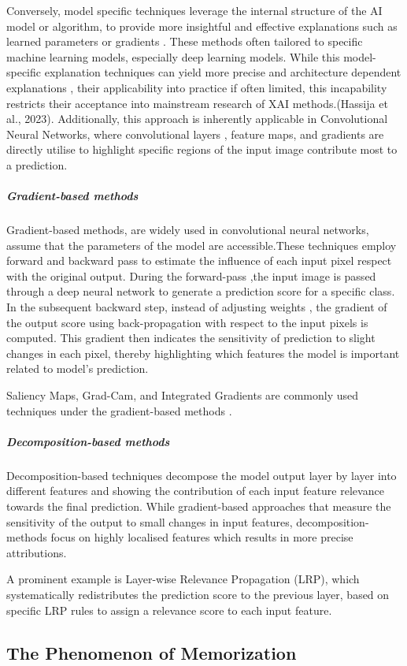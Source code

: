 Conversely, model specific techniques leverage the internal structure of the AI model or algorithm, to provide more insightful and effective explanations such as learned parameters or gradients . These methods often tailored to specific machine learning models, especially deep learning models. While this model-specific explanation techniques can yield more precise and architecture dependent explanations , their applicability into practice if often limited, this incapability restricts their acceptance into mainstream research of XAI methods.(Hassija et al., 2023). Additionally, this approach is inherently applicable in Convolutional Neural Networks, where convolutional layers , feature maps, and gradients are directly utilise to highlight specific regions of the input image contribute most to a prediction.

\subparagraph{Gradient-based methods}
Gradient-based methods, are widely used in convolutional neural networks, assume that the parameters of the model are accessible.These techniques employ forward and backward pass to estimate the  influence of each input pixel respect with the original output. During the  forward-pass ,the input image is passed through a deep neural network to generate a prediction score for a specific class. In the subsequent backward step, instead of adjusting weights , the gradient of the output score using back-propagation with respect to the input pixels is computed. This gradient then indicates the sensitivity of prediction to slight changes in each pixel, thereby highlighting which features the model is important related to model’s prediction.

Saliency Maps, Grad-Cam, and Integrated Gradients are commonly used techniques under the gradient-based methods .
\subparagraph{Decomposition-based methods}
Decomposition-based techniques decompose the model output layer by layer into different features and showing the contribution of each input feature relevance towards the final prediction. While  gradient-based approaches that measure  the sensitivity of the output to small changes in input features, decomposition-methods focus on highly localised features which results in more precise attributions.

A prominent example is Layer-wise Relevance Propagation (LRP), which systematically redistributes the prediction score to the previous layer, based on specific LRP rules to assign a relevance score to each input feature.
\clearpage

\clearpage
\subsection{The Phenomenon of Memorization}




























